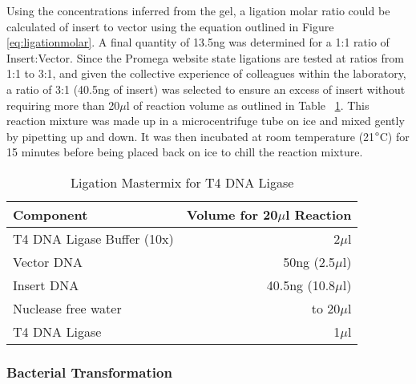 Using the concentrations inferred from the gel, a ligation molar ratio could be calculated of insert to vector using the equation outlined in Figure \ref{eq:ligationmolar}. A final quantity of 13.5ng was determined for a 1:1 ratio of Insert:Vector. Since the Promega website state ligations are tested at ratios from 1:1 to 3:1, and given the collective experience of colleagues within the laboratory, a ratio of 3:1 (40.5ng of insert) was selected to ensure an excess of insert without requiring more than 20$\mu$l of reaction volume as outlined in Table ~\ref{tab:Ligation}. This reaction mixture was made up in a microcentrifuge tube on ice and mixed gently by pipetting up and down. It was then incubated at room temperature (21$\degree$C) for 15 minutes before being placed back on ice to chill the reaction mixture.  \\

\begin{table}[!htbp]
\centering
\footnotesize
\begin{tabular}{lr}
  
  Component                         & Volume for 20$\mu$l Reaction\\
  \hline
  T4 DNA Ligase Buffer (10x)        & 2$\mu$l \\
  Vector DNA                        & 50ng (2.5$\mu$l) \\
  Insert DNA                        & 40.5ng (10.8$\mu$l) \\
  Nuclease free water               & to 20$\mu$l \\
  T4 DNA Ligase                     & 1$\mu$l  \\
\end{tabular}
\caption{Ligation Mastermix for T4 DNA Ligase}
\label{tab:Ligation}
\end{table}

\subsubsection{Bacterial Transformation}

